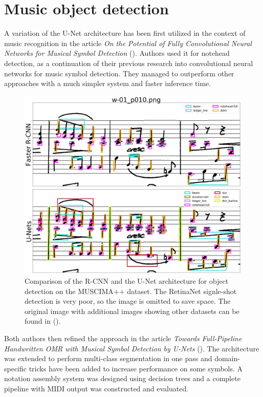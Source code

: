 \section{Music object detection}

A variation of the U-Net architecture has been first utilized in the context of music recognition in the article \emph{On the Potential of Fully Convolutional Neural Networks for Musical Symbol Detection} (\cite{DorferEtAl}). Authors used it for notehead detection, as a continuation of their previous research into convolutional neural networks for music symbol detection. They managed to outperform other approaches with a much simpler system and faster inference time.

\begin{figure}[ht]
    \centering
    \includegraphics[width=145mm]{../img/muscima-detection-comparison.png}
    \caption{Comparison of the R-CNN and the U-Net architecture for object detection on the MUSCIMA++ dataset. The RetinaNet signle-shot detection is very poor, so the image is omitted to save space. The original image with additional images showing other datasets can be found in (\cite{PachaBaseline}).}
    \label{fig:MuscimaDetectionComparison}
\end{figure}

Both authors then refined the approach in the article \emph{Towards Full-Pipeline Handwritten OMR with Musical Symbol Detection by U-Nets} (\cite{HajicEtAl}). The architecture was extended to perform multi-class segmentation in one pass and domain-specific tricks have been added to increase performance on some symbols. A notation assembly system was designed using decision trees and a complete pipeline with MIDI output was constructed and evaluated.

